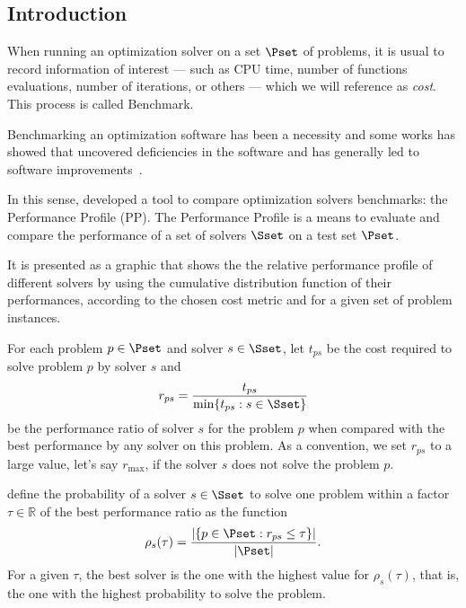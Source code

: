 \subsection*{Introduction}

    When running an optimization solver on a set  $\Pset$ of problems, it is
    usual to record   information of interest --- such as CPU time, number of functions     evaluations, number of iterations, or others --- which we will reference    as \emph{cost}. This process is  called Benchmark. 

    Benchmarking an optimization software has been a necessity and some works 
    has showed that uncovered deficiencies in the software and has 
    generally led to software improvements~\cite{url:mittelmann,Mittelmann:1999fb,Dolan:2006kl}. 

    In this
    sense,  \textcite{Dolan:2002du} developed a tool to compare optimization solvers benchmarks:  the Performance Profile (PP).
    The Performance Profile is a means 
    to evaluate and compare the performance of a set of solvers $\Sset$ on a 
    test set $\Pset$. 

    It is presented as a graphic that shows the the relative performance profile of different solvers by using the cumulative
    distribution function of their performances,
    according to the  chosen cost metric and for a given set of problem instances.

    For each problem $p \in \Pset$ and solver $s \in \Sset$, let $t_{ps}$
    be the cost required to solve problem $p$ by solver $s$ and
    \begin{align*} r_{ps} = \frac{t_{ps}}{\min\{t_{ps}: s \in \Sset\}}
    \end{align*} be the performance ratio of solver $s$ for the problem $p$
    when compared with the best performance by any solver on this problem.
    As a convention, we set $r_{ps}$ to a large value, let's say $r_{\max}$, if
    the solver $s$ does not solve the problem $p$.


    \textcite{Dolan:2002du} define the probability of a solver $s \in \Sset$ to
    solve one problem within a factor $\tau \in \mathds{R}$ of the best
    performance ratio as the function
    \begin{align*}
      \rho_s(\tau) = \frac{| \{p \in \Pset: r_{ps} \leq \tau\} |}{| \Pset |}.
    \end{align*}
    For a given $\tau$, the best solver is the one with the highest value for
    $\rho_s(\tau)$, that is, the one with the highest probability to solve the
    problem.


